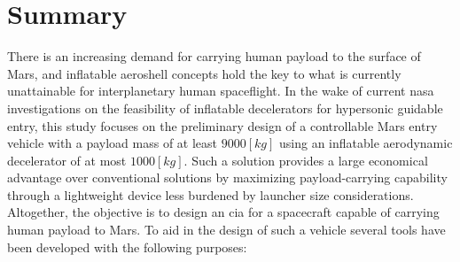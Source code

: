 \section*{Summary}\label{cha:summary}
There is an increasing demand for carrying human payload to the surface of Mars, and inflatable aeroshell concepts hold the key to what is currently unattainable for interplanetary human spaceflight. In the wake of current \acrshort{nasa} investigations on the feasibility of inflatable decelerators for hypersonic guidable entry, this study focuses on the preliminary design of a controllable Mars entry vehicle with a payload mass of at least $9000 \left[kg\right]$ using an inflatable aerodynamic decelerator of at most $1000 \left[kg\right]$. Such a solution provides a large economical advantage over conventional solutions by maximizing payload-carrying capability through a lightweight device less burdened by launcher size considerations. Altogether, the objective is to design an \acrfull{cia} for a spacecraft capable of carrying human payload to Mars.
\newline
\newline
To aid in the design of such a vehicle several tools have been developed with the following purposes:

